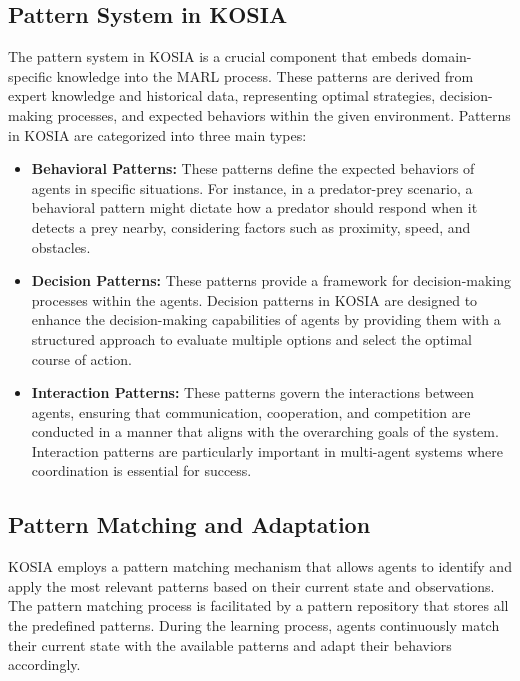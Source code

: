 \documentclass[sn-mathphys-num]{sn-jnl}%
\theoremstyle{thmstyleone}%
\theoremstyle{thmstyletwo}%
\theoremstyle{thmstylethree}%
\begin{document}
\subsection{Pattern System in KOSIA}
The pattern system in KOSIA is a crucial component that embeds domain-specific knowledge into the MARL process. These patterns are derived from expert knowledge and historical data, representing optimal strategies, decision-making processes, and expected behaviors within the given environment. Patterns in KOSIA are categorized into three main types:

\begin{itemize}
    \item \textbf{Behavioral Patterns:} These patterns define the expected behaviors of agents in specific situations. For instance, in a predator-prey scenario, a behavioral pattern might dictate how a predator should respond when it detects a prey nearby, considering factors such as proximity, speed, and obstacles.
    
    \item \textbf{Decision Patterns:} These patterns provide a framework for decision-making processes within the agents. Decision patterns in KOSIA are designed to enhance the decision-making capabilities of agents by providing them with a structured approach to evaluate multiple options and select the optimal course of action.
    
    \item \textbf{Interaction Patterns:} These patterns govern the interactions between agents, ensuring that communication, cooperation, and competition are conducted in a manner that aligns with the overarching goals of the system. Interaction patterns are particularly important in multi-agent systems where coordination is essential for success.
\end{itemize}

\subsection{Pattern Matching and Adaptation}
KOSIA employs a pattern matching mechanism that allows agents to identify and apply the most relevant patterns based on their current state and observations. The pattern matching process is facilitated by a pattern repository that stores all the predefined patterns. During the learning process, agents continuously match their current state with the available patterns and adapt their behaviors accordingly.
\end{document}
